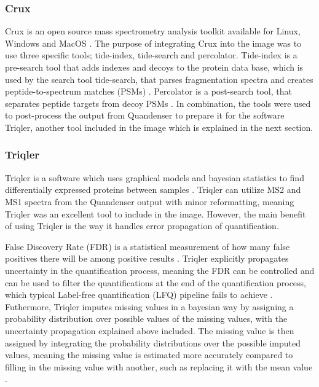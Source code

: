 \subsubsection{Crux}
Crux is an open source mass spectrometry analysis toolkit available for Linux, Windows and MacOS \cite{crux}. The purpose of integrating Crux into the image was to use three specific tools; tide-index, tide-search and percolator. Tide-index is a pre-search tool that adds indexes and decoys to the protein data base, which is used by the search tool tide-search, that parses fragmentation spectra and creates peptide-to-spectrum matches (PSMs) \cite{tide-search}. Percolator is a post-search tool, that separates peptide targets from decoy PSMs \cite{percolator}. In combination, the tools were used to post-process the output from Quandenser to prepare it for the software Triqler, another tool included in the image which is explained in the next section.

\subsubsection{Triqler}
Triqler is a software which uses graphical models and bayesian statistics to find differentially expressed proteins between samples \cite{triqler}. Triqler can utilize MS2 and MS1 spectra from the Quandenser output with minor reformatting, meaning Triqler was an excellent tool to include in the image. However, the main benefit of using Triqler is the way it handles error propagation of quantification.

False Discovery Rate (FDR) is a statistical measurement of how many false positives there will be among positive results \cite{fdr}.  Triqler explicitly propagates uncertainty in the quantification process, meaning the FDR can be controlled and can be used to filter the quantifications at the end of the quantification process, which typical Label-free quantification (LFQ) pipeline fails to achieve \cite{triqler}. Futhermore, Triqler imputes missing values in a bayesian way by assigning a probability distribution over possible values of the missing values, with the uncertainty propagation explained above included. The missing value is then assigned by integrating the probability distributions over the possible imputed values, meaning the missing value is estimated more accurately compared to filling in the missing value with another, such as replacing it with the mean value \cite{triqler}.

